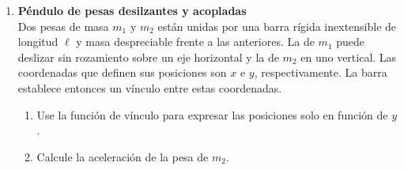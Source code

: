 \documentclass[11pt, spanish, a4paper, twoside]{article}
\begin{document}
\begin{enumerate}
	\item 
	\begin{minipage}[t][5cm]{0.75\textwidth}
		\textbf{Péndulo de pesas desilzantes y acopladas}\\ 
		Dos pesas de masa \(m_1\) y \(m_2\) están unidas por una barra rígida inextensible de longitud \(\ell\) y masa despreciable frente a las anteriores.
		La de \(m_1\) puede deslizar sin rozamiento sobre un eje horizontal y la de \(m_2\) en uno vertical.
		Las coordenadas que definen sus posiciones son \(x\) e \(y\), respectivamente.
		La barra establece entonces un vínculo entre estas coordenadas.
	\begin{enumerate}
		\item Use la función de vínculo para expresar las posiciones solo en función de \(y\).
		\item Calcule la aceleración de la pesa de \(m_2\). %
	

\end{enumerate}
\end{minipage}
\end{enumerate}
\end{document}
